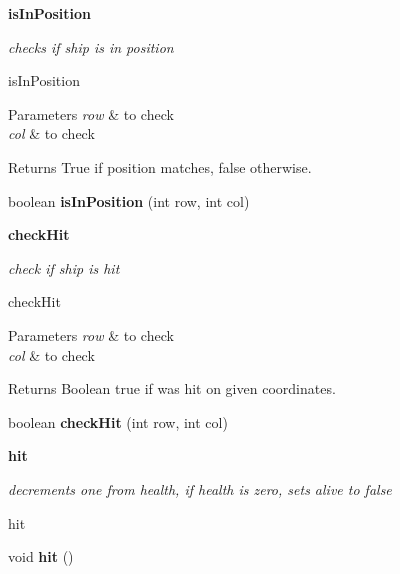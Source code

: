 \begin{Indent}{\bf is\+In\+Position}\par
{\em checks if ship is in position

is\+In\+Position


\begin{DoxyParams}{Parameters}
{\em row} & to check \\
\hline
{\em col} & to check \\
\hline
\end{DoxyParams}
\begin{DoxyReturn}{Returns}
True if position matches, false otherwise. 
\end{DoxyReturn}
}\begin{DoxyCompactItemize}
\item 
\hypertarget{classbattleship_1_1ships_1_1Ship_a80a3e1062c83c987fa703d407f495cfa}{}boolean {\bfseries is\+In\+Position} (int row, int col)\label{classbattleship_1_1ships_1_1Ship_a80a3e1062c83c987fa703d407f495cfa}

\end{DoxyCompactItemize}
\end{Indent}
\begin{Indent}{\bf check\+Hit}\par
{\em check if ship is hit

check\+Hit


\begin{DoxyParams}{Parameters}
{\em row} & to check \\
\hline
{\em col} & to check \\
\hline
\end{DoxyParams}
\begin{DoxyReturn}{Returns}
Boolean true if was hit on given coordinates. 
\end{DoxyReturn}
}\begin{DoxyCompactItemize}
\item 
\hypertarget{classbattleship_1_1ships_1_1Ship_a45e5de2a793e933a133cbfbfc0ee43e8}{}boolean {\bfseries check\+Hit} (int row, int col)\label{classbattleship_1_1ships_1_1Ship_a45e5de2a793e933a133cbfbfc0ee43e8}

\end{DoxyCompactItemize}
\end{Indent}
\begin{Indent}{\bf hit}\par
{\em decrements one from health, if health is zero, sets alive to false

hit }\begin{DoxyCompactItemize}
\item 
\hypertarget{classbattleship_1_1ships_1_1Ship_a863316a920e517d05e777578b5e7195b}{}void {\bfseries hit} ()\label{classbattleship_1_1ships_1_1Ship_a863316a920e517d05e777578b5e7195b}

\end{DoxyCompactItemize}
\end{Indent}
